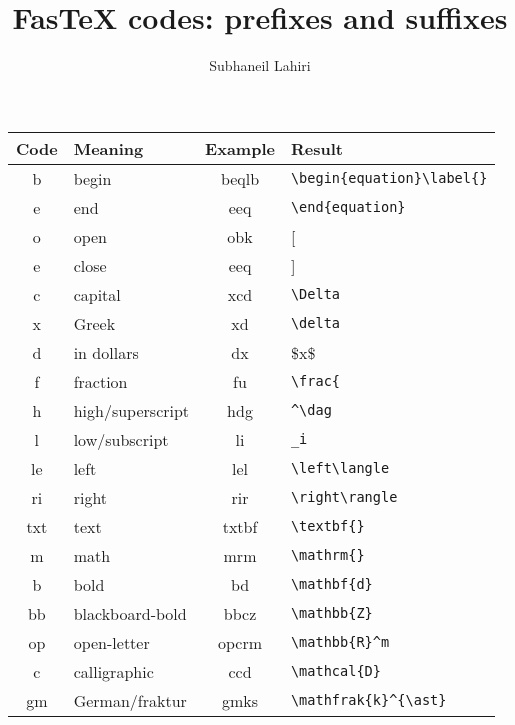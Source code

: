 \documentclass[11pt]{article}
\begin{document}
\title{FasTeX codes: prefixes and suffixes}
\author{Subhaneil Lahiri}
\date{}
\maketitle

\begin{center}
\begin{tabular}{>{\ttfamily}cl>{\ttfamily}c>{\ttfamily}l}
\toprule
  \textnormal{Code} & Meaning & \textnormal{Example} & \textnormal{Result} \\
\midrule
  b & begin             & beqlb{} & \verb.\begin{equation}\label{}. \\
  e & end{}             & eeq{}   & \verb.\end{equation}. \\
  o & open              & obk{}   & [ \\
  e & close             & eeq{}   & ] \\
  c & capital           & xcd{}   & \verb.\Delta. \\
  x & Greek             & xd{}    & \verb.\delta. \\
  d & in dollars        & dx{}    & \$x\$ \\
  f & fraction          & fu{}    & \verb.\frac{. \\
  h & high/superscript{}& hdg{}   & \verb.^\dag. \\
  l & low/subscript{}   & li{}    & \verb._i. \\
  le& left              & lel{}   & \verb.\left\langle. \\
  ri& right             & rir{}   & \verb.\right\rangle. \\
 txt& text              & txtbf{} & \verb.\textbf{}. \\
  m & math              & mrm{}   & \verb.\mathrm{}. \\
  b & bold{}            & bd{}    & \verb.\mathbf{d}. \\
  bb& blackboard-bold{} & bbcz{}  & \verb.\mathbb{Z}. \\
  op& open-letter       & opcrm{} & \verb.\mathbb{R}^m. \\
  c & calligraphic      & ccd{}   & \verb.\mathcal{D}. \\
  gm& German/fraktur    & gmks{}  & \verb.\mathfrak{k}^{\ast}. \\

\end{tabular}
\end{center}
\end{document}
